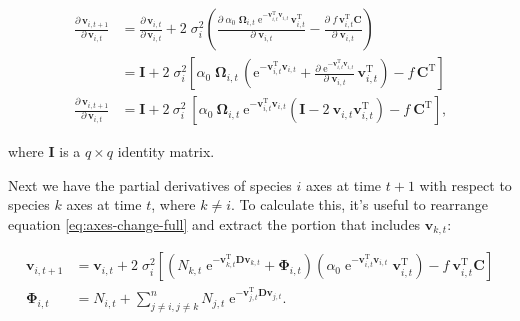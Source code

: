 \begin{equation*}
\begin{split}
    \frac{ \partial \, \mathbf{v}_{i,t+1} }{ \partial \, \mathbf{v}_{i,t} } &=
        \frac{ \partial \, \mathbf{v}_{i,t} }{ \partial \, \mathbf{v}_{i,t} } +
        2 \; \sigma_i^2
        \left(
            \frac{ \partial \;
                \alpha_0 \; \mathbf{\Omega}_{i,t} \;
                    \textrm{e}^{-\mathbf{v}_{i,t}^{\textrm{T}} \mathbf{v}_{i,t}} \,
                    \mathbf{v}_{i,t}^{\textrm{T}}}{\partial \; \mathbf{v}_{i,t} } -
            \frac{ \partial \; f \, \mathbf{v}_{i,t}^{\textrm{T}} \mathbf{C}}{\partial \; \mathbf{v}_{i,t} }
        \right) \\
    &=
        \mathbf{I} +
        2 \; \sigma_i^2
        \left[
            \alpha_0 \; \mathbf{\Omega}_{i,t} \,
            \left(
                \textrm{e}^{-\mathbf{v}_{i,t}^{\textrm{T}} \mathbf{v}_{i,t}} +
                \frac{ \partial \;
                        \textrm{e}^{-\mathbf{v}_{i,t}^{\textrm{T}} \mathbf{v}_{i,t}}
                        }{\partial \; \mathbf{v}_{i,t} } \, \mathbf{v}_{i,t}^{\textrm{T}}
            \right) -
            f \, \mathbf{C}^{\textrm{T}}
            \right] \\[2ex]
    \frac{ \partial \, \mathbf{v}_{i,t+1} }{ \partial \, \mathbf{v}_{i,t} } &= \mathbf{I} + 2 ~ \sigma_i^2 ~
        \left[
            \alpha_0 ~ \mathbf{\Omega}_{i,t} ~ \textrm{e}^{ - \mathbf{v}_{i,t}^{\textrm{T}} \mathbf{v}_{i,t} }
            \left(
                \mathbf{I} - 2 ~ \mathbf{v}_{i,t} \mathbf{v}_{i,t}^{\textrm{T}}
            \right) -
            f \: \mathbf{C}^{\textrm{T}}
        \right]
    \textrm{,}
\end{split}
\end{equation*}

\noindent where $\mathbf{I}$ is a $q \times q$ identity matrix.


Next we have the partial derivatives of species $i$ axes at time $t+1$ with respect to 
species $k$ axes at time $t$, where $k \ne i$.
To calculate this, it's useful to rearrange equation \ref{eq:axes-change-full} and
extract the portion that includes $\mathbf{v}_{k,t}$:


\begin{equation*}
\begin{split}
    \mathbf{v}_{i,t+1} &= \mathbf{v}_{i,t} + 2 \; \sigma_i^2
    \left[
        \left(
            N_{k,t} \; \textrm{e}^{ -\mathbf{v}_{k,t}^{\textrm{T}} \mathbf{D}
            \mathbf{v}_{k,t} } + \mathbf{\Phi}_{i,t}
        \right)
        \left(
            \alpha_0 \; \textrm{e}^{-\mathbf{v}_{i,t}^{\textrm{T}}
            \mathbf{v}_{i,t} } \; \mathbf{v}_{i,t}^{\textrm{T}}
        \right)
        - f \: \mathbf{v}_{i,t}^{\textrm{T}} \mathbf{C}
    \right] \\
    \mathbf{\Phi}_{i,t} &= N_{i,t} + \sum_{j \ne i, j \ne k}^{n}{
        N_{j,t} \; \textrm{e}^{- \mathbf{v}_{j,t}^{\textrm{T}}
        \mathbf{D} \mathbf{v}_{j,t} } }
    \textrm{.}
\end{split}
\end{equation*}

